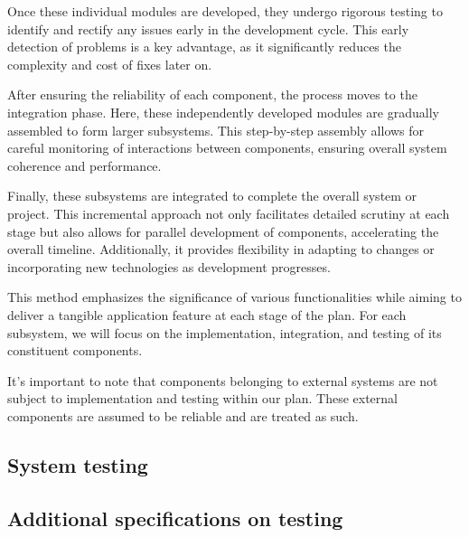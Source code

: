 Once these individual modules are developed, they undergo rigorous testing to identify and rectify any issues early in the development cycle. This early detection of problems is a key advantage, as it significantly reduces the complexity and cost of fixes later on. 

After ensuring the reliability of each component, the process moves to the integration phase. Here, these independently developed modules are gradually assembled to form larger subsystems. This step-by-step assembly allows for careful monitoring of interactions between components, ensuring overall system coherence and performance.

Finally, these subsystems are integrated to complete the overall system or project. This incremental approach not only facilitates detailed scrutiny at each stage but also allows for parallel development of components, accelerating the overall timeline. Additionally, it provides flexibility in adapting to changes or incorporating new technologies as development progresses. 

 This method emphasizes the significance of various functionalities while aiming to deliver a tangible application feature at each stage of the plan. For each subsystem, we will focus on the implementation, integration, and testing of its constituent components.

It's important to note that components belonging to external systems are not subject to implementation and testing within our plan. These external components are assumed to be reliable and are treated as such.

\subsection{System testing}
\subsection{Additional specifications on testing}